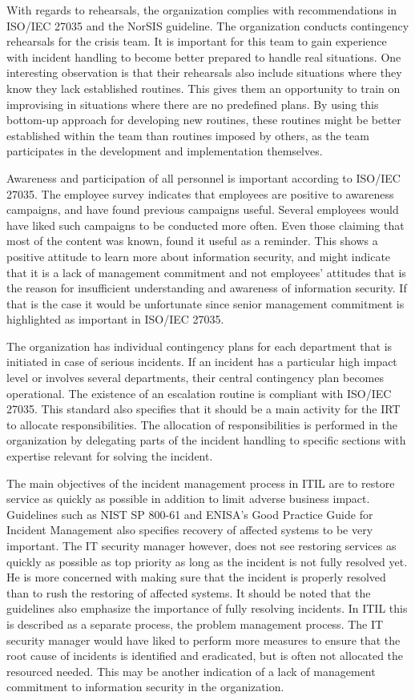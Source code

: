 With regards to rehearsals, the organization complies with recommendations in ISO/IEC 27035 and the NorSIS guideline. The organization conducts contingency rehearsals for the crisis team. It is important for this team to gain experience with incident handling to become better prepared to handle real situations. One interesting observation is that their rehearsals also include situations where they know they lack established routines. This gives them an opportunity to train on improvising in situations where there are no predefined plans. By using this bottom-up approach for developing new routines, these routines might be better established within the team than routines imposed by others, as the team participates in the development and implementation themselves.

Awareness and participation of all personnel is important according to ISO/IEC 27035. The employee survey indicates that employees are positive to awareness campaigns, and have found previous campaigns useful. Several employees would have liked such campaigns to be conducted more often. Even those claiming that most of the content was known, found it useful as a reminder. This shows a positive attitude to learn more about information security, and might indicate that it is a lack of management commitment and not employees' attitudes that is the reason for insufficient understanding and awareness of information security. If that is the case it would be unfortunate since senior management commitment is highlighted as important in ISO/IEC 27035.

The organization has individual contingency plans for each department that is initiated in case of serious incidents. If an incident has a particular high impact level or involves several departments, their central contingency plan becomes operational. The existence of an escalation routine is compliant with ISO/IEC 27035. This standard also specifies that it should be a main activity for the \ac{IRT} to allocate responsibilities. The allocation of responsibilities is performed in the organization by delegating parts of the incident handling to specific sections with expertise relevant for solving the incident.

The main objectives of the incident management process in ITIL are to restore service as quickly as possible in addition to limit adverse business impact. Guidelines such as NIST SP 800-61 and ENISA's Good Practice Guide for Incident Management also specifies recovery of affected systems to be very important.  The IT security manager however, does not see restoring services as quickly as possible as top priority as long as the incident is not fully resolved yet. He is more concerned with making sure that the incident is properly resolved than to rush the restoring of affected systems. It should be noted that the guidelines also emphasize the importance of fully resolving incidents. In ITIL this is described as a separate process, the problem management process. The IT security manager would have liked to perform more measures to ensure that the root cause of incidents is identified and eradicated, but is often not allocated the resourced needed. This may be another indication of a lack of management commitment to information security in the organization.

